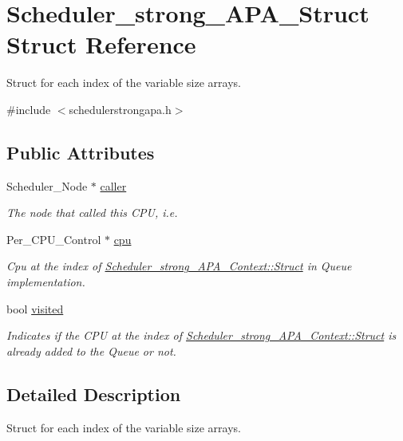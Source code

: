 \hypertarget{structScheduler__strong__APA__Struct}{}\section{Scheduler\+\_\+strong\+\_\+\+A\+P\+A\+\_\+\+Struct Struct Reference}
\label{structScheduler__strong__APA__Struct}


Struct for each index of the variable size arrays.  




{\ttfamily \#include $<$schedulerstrongapa.\+h$>$}

\subsection*{Public Attributes}
\begin{DoxyCompactItemize}
\item 
Scheduler\+\_\+\+Node $\ast$ \hyperlink{structScheduler__strong__APA__Struct_a9ab1e221dcee9eaebb131158da9a338e}{caller}
\begin{DoxyCompactList}\small\item\em The node that called this C\+PU, i.\+e. \end{DoxyCompactList}\item 
Per\+\_\+\+C\+P\+U\+\_\+\+Control $\ast$ \hyperlink{structScheduler__strong__APA__Struct_a83534c31f08a040a5a24b48007f17a09}{cpu}
\begin{DoxyCompactList}\small\item\em Cpu at the index of \hyperlink{structScheduler__strong__APA__Context_ac25debff84510636df8e42c5750ace15}{Scheduler\+\_\+strong\+\_\+\+A\+P\+A\+\_\+\+Context\+::\+Struct} in Queue implementation. \end{DoxyCompactList}\item 
bool \hyperlink{structScheduler__strong__APA__Struct_ab611e883dcef8c5226f00c734876b132}{visited}
\begin{DoxyCompactList}\small\item\em Indicates if the C\+PU at the index of \hyperlink{structScheduler__strong__APA__Context_ac25debff84510636df8e42c5750ace15}{Scheduler\+\_\+strong\+\_\+\+A\+P\+A\+\_\+\+Context\+::\+Struct} is already added to the Queue or not. \end{DoxyCompactList}\end{DoxyCompactItemize}


\subsection{Detailed Description}
Struct for each index of the variable size arrays. 

